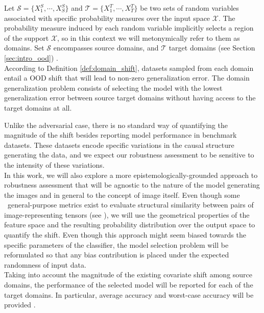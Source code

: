 \begin{definition}
    Let $\mathcal{S} = \{X^S_1, \cdots, X^S_S\}$ and $\mathcal{T} = \{X^T_1, \cdots, X^T_T\}$ 
    be two sets of random variables associated with specific probability measures 
    over the input space $\mathcal{X}$. The probability measure 
    induced by each random variable implicitly selects a region of
    the support $\mathcal{X}$, so in this context we will metonymically 
    refer to them as domains. Set $\mathcal{S}$ encompasses source domains,
    and $\mathcal{T}$ target domains (see Section \ref{sec:intro_ood})
    \cite{liuOutOfDistributionGeneralizationSurvey2023,wangGeneralizingUnseenDomains2022}. \\

    According to Definition \ref{def:domain_shift}, datasets sampled from each domain
    entail a OOD shift that will lead to non-zero generalization error. The 
    domain generalization problem consists of selecting the model with
    the lowest generalization error between source target domains without
    having access to the target domains at all. 
\end{definition}

Unlike the adversarial case, there is no standard way of quantifying
the magnitude of the shift besides reporting model performance in benchmark
datasets. These datasets encode specific variations in the causal structure generating
the data, and we expect our robustness assessment to be sensitive to the intensity
of these variations. \\

In this work, we will also explore a more epistemologically-grounded
approach to robustness assessment that will be agnostic to the nature of the model
generating the images and in general to the concept of image itself. Even though some \
general-purpose metrics exist to evaluate structural similarity between pairs 
of image-representing tensors (see \cite{guoComprehensiveEvaluationFramework2023}),
we will use the geometrical properties of the feature space and the resulting
probability distribution over the output space to quantify the shift. Even though
this approach might seem biased towards the specific parameters of the classifier, 
the model selection problem will be reformulated so that any bias contribution
is placed under the expected randomness of input data.\\

Taking into account the magnitude of the existing covariate shift among source
domains, the performance of the selected model will be reported for each of
the target domains. In particular, average accuracy and worst-case accuracy
will be provided \cite{zhouDomainGeneralizationSurvey2022}.

